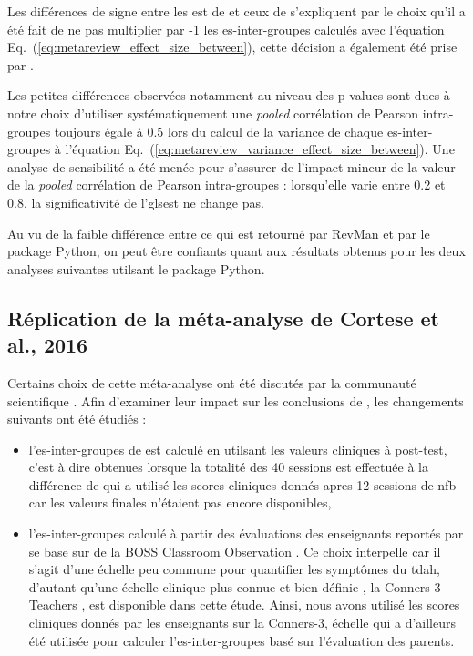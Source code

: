 Les différences de signe entre les \gls{est} de \citet{Cortese2016} et ceux de \citet{Bussalb2019a} s'expliquent par le choix qu'il a été fait de ne pas multiplier
par -1 les \gls{es}-inter-groupes calculés avec l'équation Eq.~(\ref{eq:metareview_effect_size_between}), cette décision a également été prise par 
\citet{Micoulaud2014}.

Les petites différences observées notamment au niveau des p-values sont dues à notre choix d'utiliser systématiquement une \textit{pooled} corrélation de Pearson 
intra-groupes toujours égale à 0.5 \citep{Balk2012} lors du calcul de la variance de chaque \gls{es}-inter-groupes à l'équation 
Eq.~(\ref{eq:metareview_variance_effect_size_between}). Une analyse de sensibilité a été menée pour s'assurer de l'impact mineur de la valeur de la \textit{pooled} 
corrélation de Pearson intra-groupes : lorsqu'elle varie entre 0.2 et 0.8, la significativité de l'gls{est} ne change pas.

Au vu de la faible différence entre ce qui est retourné par RevMan et par le package Python, on peut être confiants quant aux résultats obtenus pour les 
deux analyses suivantes utilsant le package Python. 

\subsection{Réplication de la méta-analyse de Cortese et al., 2016} \label{replication}

Certains choix de cette méta-analyse ont été discutés par la communauté scientifique \citep{Micoulaud2016}. Afin d'examiner leur impact sur les conclusions
de \citet{Cortese2016}, les changements suivants ont été étudiés :

\begin{itemize}
\item l'\gls{es}-inter-groupes de \citet{Arnold2014} est calculé en utilsant les valeurs cliniques à post-test, c'est à dire obtenues lorsque la totalité 
des 40 sessions est effectuée à la différence de \citet{Cortese2016} qui a utilisé les scores cliniques donnés apres 12 sessions de \gls{nfb} car les valeurs 
finales n'étaient pas encore disponibles,
\item l'\gls{es}-inter-groupes calculé à partir des évaluations des enseignants reportés par \citet{Steiner2014} se base sur de la BOSS Classroom Observation
\citep{Shapiro2010}. Ce choix interpelle car il s'agit d'une échelle peu commune pour quantifier les symptômes du \gls{tdah}, d'autant qu'une échelle clinique 
plus connue et bien définie \citep{Conners2008, Collett2003, Epstein2012}, la Conners-3 Teachers \citep{Conners1998, Bluschke2016}, est disponible dans 
cette étude. Ainsi, nous avons utilisé les scores cliniques donnés par les enseignants sur la Conners-3, échelle 
qui a d'ailleurs été utilisée pour calculer l'\gls{es}-inter-groupes basé sur l'évaluation des parents. 
\end{itemize}

